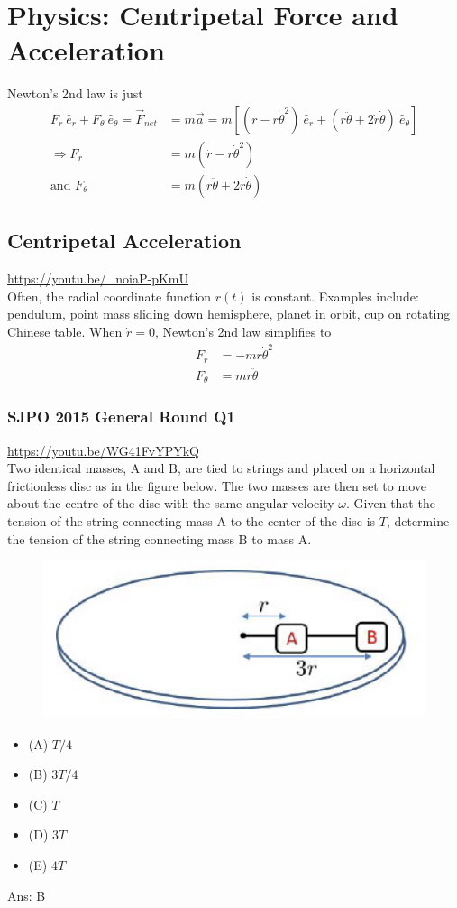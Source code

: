 \documentclass{article}
\begin{document}
\section{Physics: Centripetal Force and Acceleration}
Newton's 2nd law is just
\begin{align}
    F_r\ \hat{e}_r + F_\theta\ \hat{e}_\theta = \vec{F}_{net} & = m \vec{a} = m \left[(\ddot{r} - r{\dot\theta}^2)\ \hat{e}_r + (r\ddot\theta + 2\dot r \dot \theta)\ \hat{e}_\theta \right]\\
    \Rightarrow F_r &= m(\ddot r - r{\dot\theta}^2) \\ 
    \text{and } F_\theta &= m (r\ddot\theta + 2 \dot r \dot \theta)  
\end{align}
\subsection{Centripetal Acceleration}
\url{https://youtu.be/_noiaP-pKmU}\\
Often, the radial coordinate function $r(t)$ is constant. Examples include: pendulum, point mass sliding down hemisphere, planet in orbit, cup on rotating Chinese table. When $\dot r = 0$, Newton's 2nd law simplifies to
\begin{align}
    F_r &= -mr {\dot\theta}^2 \\
    F_\theta &= mr\ddot\theta
\end{align}
\subsubsection{SJPO 2015 General Round Q1}
\url{https://youtu.be/WG41FvYPYkQ}\\
Two identical masses, $\mathrm{A}$ and $\mathrm{B}$, are tied to strings and placed on a horizontal frictionless disc as in the figure below. The two masses are then set to move about the centre of the disc with the same angular velocity $\omega$. Given that the tension of the string connecting mass $\mathrm{A}$ to the center of the disc is $T$, determine the tension of the string connecting mass $\mathrm{B}$ to mass $\mathrm{A}$. \\
{
\begin{figure}
\includegraphics[width=1.0\linewidth]{images/sjpo2015q1.png}
\end{figure}
\begin{itemize}
\item[] (A) $T / 4$
\item[] (B) $3 T / 4$
\item[] (C) $T$
\item[] (D) $3 T$
\item[] (E) $4 T$
\end{itemize}
}
Ans: \ifpaper B \fi
\end{document}
